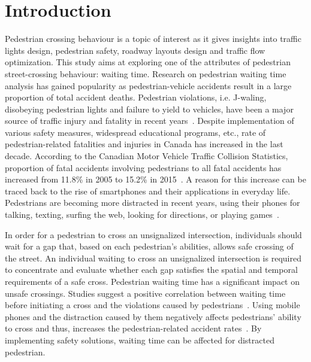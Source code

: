 \section{Introduction}
\label{S:Dint}
Pedestrian crossing behaviour is a topic of interest as it gives insights into traffic lights design, pedestrian safety, roadway layouts design and traffic flow optimization. This study aims at exploring one of the attributes of pedestrian street-crossing behaviour: waiting time. Research on pedestrian waiting time analysis has gained popularity as pedestrian-vehicle accidents result in a large proportion of total accident deaths. Pedestrian violations, i.e. J-waling, disobeying pedestrian lights and failure to yield to vehicles, have been a major source of traffic injury and fatality in recent years~\cite{Canada2005,Canada2010,Canada2015}. Despite implementation of various safety measures, widespread educational programs, etc., rate of pedestrian-related fatalities and injuries in Canada has increased in the last decade. According to the Canadian Motor Vehicle Traffic Collision Statistics, proportion of fatal accidents involving pedestrians to all fatal accidents has increased from 11.8\% in 2005 to 15.2\% in 2015~\cite{Canada2005,Canada2015}. A reason for this increase can be traced back to the rise of smartphones and their applications in everyday life. Pedestrians are becoming more distracted in recent years, using their phones for talking, texting, surfing the web, looking for directions, or playing games~\cite{Canada2010}.

In order for a pedestrian to cross an unsignalized intersection, individuals should wait for a gap that, based on each pedestrian’s abilities, allows safe crossing of the street. An individual waiting to cross an unsignalized intersection is required to concentrate and evaluate whether each gap satisfies the spatial and temporal requirements of a safe cross. Pedestrian waiting time has a significant impact on unsafe crossings. Studies suggest a positive correlation between waiting time before initiating a cross and the violations caused by pedestrians~\cite{brosseau2013impact}. Using mobile phones and the distraction caused by them negatively affects pedestrians’ ability to cross and thus, increases the pedestrian-related accident rates~\cite{banducci2016effects,dey2017impact}. By implementing safety solutions, waiting time can be affected for distracted pedestrian.

